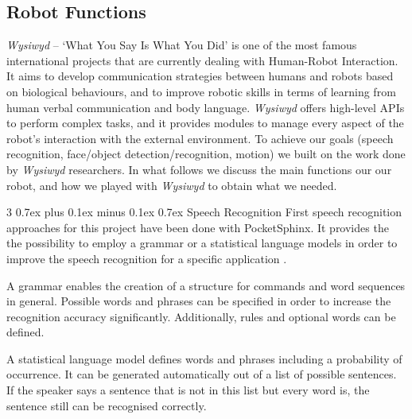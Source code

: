 \documentclass[conference]{IEEEtran}
\makeatletter
\def\subsubsection{\@startsection{subsubsection}%
	{3}%
	{\z@}%
	{0.7ex plus 0.1ex minus 0.1ex}%
	{0.7ex}%
	{\normalfont\normalsize\itshape}}%
\makeatother
\begin{document}
\subsection{Robot Functions}
\textit{Wysiwyd} -- `What You Say Is What You Did' is one of the most famous international projects that are currently dealing with Human-Robot Interaction. It aims to develop communication strategies between humans and robots based on biological behaviours, and to improve robotic skills in terms of learning from human verbal communication and body language. \textit{Wysiwyd} offers high-level APIs to perform complex tasks, and it provides modules to manage every aspect of the robot's interaction with the external environment. To achieve our goals (speech recognition, face/object detection/recognition, motion) we built on the work done by \textit{Wysiwyd} researchers. In what follows we discuss the main functions our our robot, and how we played with \textit{Wysiwyd} to obtain what we needed.

\subsubsection{Speech Recognition}
First speech recognition approaches for this project have been done with PocketSphinx.
It provides the the possibility to employ a grammar or a statistical language models in order to improve the speech recognition for a specific application \cite{SphinxLangModel}.

A grammar enables the creation of a structure for commands and word sequences in general. Possible words and phrases can be specified in order to increase the recognition accuracy significantly. Additionally, rules and optional words can be defined.

A statistical language model defines words and phrases including a probability of occurrence. It can be generated automatically out of a list of possible sentences. If the speaker says a sentence that is not in this list but every word is, the sentence still can be recognised correctly. 
\end{document}
